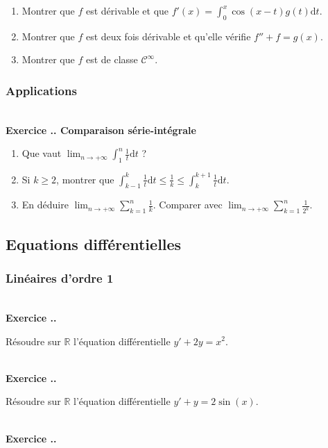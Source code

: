 \documentclass{article}
\newcommand{\di}{\mathrm{d}}
\newcommand{\mb}[1]{\mathbb{#1}}
\newcommand{\mc}[1]{\mathcal{#1}}
\newcounter{exo}
\newcommand{\exercice}[1][\null]{\textbf{\\ Exercice \thesection.\theexo. #1} \addtocounter{exo}{1}}
\begin{document}
\begin{enumerate}

\item Montrer que $f$ est dérivable et que $f'(x) =  \displaystyle \int_0^x \cos(x-t) g(t) \di t$.

\item Montrer que $f$ est deux fois dérivable et qu'elle vérifie $f'' + f = g(x)$.

\item Montrer que $f$ est de classe $\mc{C}^\infty$.

\end{enumerate}


\subsubsection{Applications}

\exercice[Comparaison série-intégrale]

\begin{enumerate}

\item Que vaut $\displaystyle \lim_{n \rightarrow + \infty} \int_1^{n} \frac{1}{t} \di  t$ ?

\item Si $k \ge 2$, montrer que $ \displaystyle \int_{k-1}^{k} \frac{1}{t} \di  t \le \frac{1}{k} \le \int_{k}^{k+1} \frac{1}{t} \di  t$.

\item En déduire $\displaystyle  \lim_{n \rightarrow + \infty} \sum_{k = 1}^{n} \frac{1}{k}$. Comparer avec $\displaystyle  \lim_{n \rightarrow + \infty} \sum_{k = 1}^{n} \frac{1}{2^k}$.
\end{enumerate}


\subsection{Equations différentielles}

\subsubsection{Linéaires d'ordre 1}

\exercice

Résoudre sur $\mb{R}$ l'équation différentielle $y' + 2y = x^2$.

\exercice

Résoudre sur $\mb{R}$ l'équation différentielle  $y' + y=2 \sin(x)$.


\exercice
\end{document}
